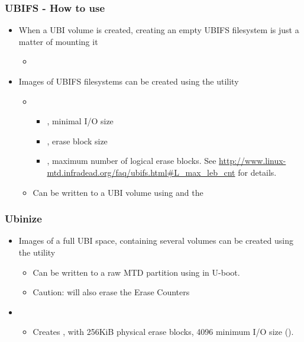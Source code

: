 \begin{frame}
  \frametitle{UBIFS - How to use}
  \begin{itemize}
  \item When a UBI volume is created, creating an empty UBIFS
    filesystem is just a matter of mounting it
    \begin{itemize}
    \item {}
    \end{itemize}
  \item Images of UBIFS filesystems can be created using the
     utility
    \begin{itemize}
    \item {}
      \begin{itemize}
      \item {}, minimal I/O size
      \item {}, erase block size
      \item {}, maximum number of logical erase
        blocks. See
        \url{http://www.linux-mtd.infradead.org/faq/ubifs.html\#L_max_leb_cnt}
        for details.
      \end{itemize}
    \item Can be written to a UBI volume using  and
      the 
    \end{itemize}
  \end{itemize}
\end{frame}

\begin{frame}
  \frametitle{Ubinize}
  \begin{itemize}
  \item Images of a full UBI space, containing several volumes can be
    created using the  utility
    \begin{itemize}
    \item Can be written to a raw MTD partition using  in U-boot.
    \item Caution:  will also erase the Erase
      Counters
    \end{itemize}
  \item {}
    \begin{itemize}
    \item Creates , with 256KiB physical erase blocks,
      4096 minimum I/O size ().
    \end{itemize}
  \end{itemize}
\end{frame}

